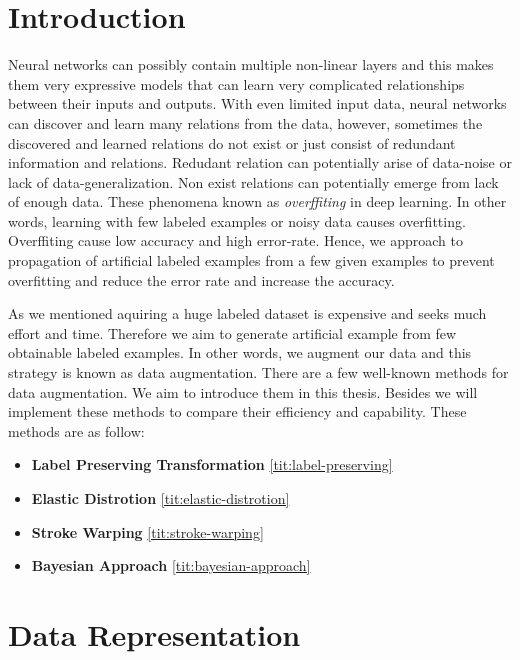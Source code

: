 \chapter{Introduction}

Neural networks can possibly contain multiple non-linear layers and this makes them very expressive models
that can learn very complicated relationships between their inputs and outputs. With even limited
input data, neural networks can discover and learn many relations from the data, however, sometimes the
discovered and learned relations do not exist or just consist of redundant information and
relations. Redudant relation can potentially arise of data-noise or lack of data-generalization. Non
exist relations can potentially emerge from lack of enough data. These phenomena known as
\textit{overffiting} in deep learning. In other words, learning with few labeled examples or noisy
data causes overfitting. Overffiting cause low accuracy and high error-rate. Hence, we approach to propagation of artificial
labeled examples from a few given examples to prevent overfitting and reduce the error rate and increase
the accuracy.

As we mentioned aquiring a huge labeled dataset is expensive and seeks much effort and time. Therefore we aim to generate artificial example from few obtainable labeled examples. In other words, we
augment our data and this strategy is known as data augmentation. There are a few well-known methods for data augmentation. We aim to introduce them in this thesis.  Besides we will implement these
methods to compare their efficiency and capability. These methods are as follow:
\begin{itemize}
  \item \textbf{Label Preserving Transformation} \ref{tit:label-preserving}
  \item \textbf{Elastic Distrotion} \ref{tit:elastic-distrotion}
  \item \textbf{Stroke Warping} \ref{tit:stroke-warping}
  \item \textbf{Bayesian Approach} \ref{tit:bayesian-approach}
\end{itemize}



\chapter{Data Representation}
\label{tit:data-representation}

